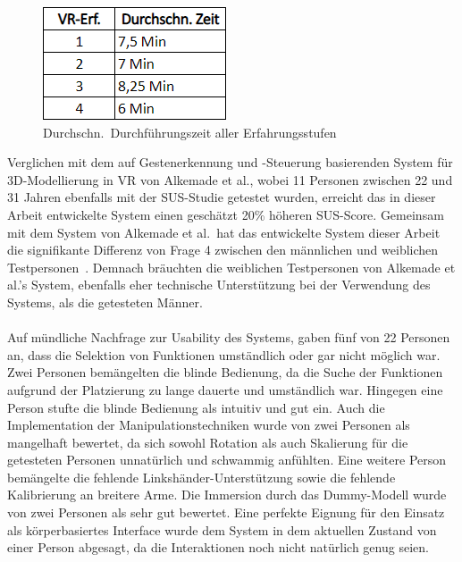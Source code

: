 \begin{figure}[h]
\captionsetup{width=.7\linewidth}
\includegraphics[scale=1.0]{Bilder/Hauptteil/durchschnittzeitvrerf}
\centering
\caption{Durchschn.~Durchführungszeit aller Erfahrungsstufen}
\label{fig:durchschnittzeitalle}
\end{figure}

\noindent Verglichen mit dem auf Gestenerkennung und -Steuerung basierenden System für 3D-Modellierung in VR von Alkemade et al., wobei 11 Personen zwischen 22 und 31 Jahren ebenfalls mit der SUS-Studie getestet wurden, erreicht das in dieser Arbeit entwickelte System einen geschätzt 20\% höheren SUS-Score. Gemeinsam mit dem System von Alkemade et al.~hat das entwickelte System dieser Arbeit die signifikante Differenz von Frage 4 zwischen den männlichen und weiblichen Testpersonen~\citep{alkemade}. Demnach bräuchten die weiblichen Testpersonen von Alkemade et al.'s System, ebenfalls eher technische Unterstützung bei der Verwendung des Systems, als die getesteten Männer.
\\
\\
Auf mündliche Nachfrage zur Usability des Systems, gaben fünf von 22 Personen an, dass die Selektion von Funktionen umständlich oder gar nicht möglich war. Zwei Personen bemängelten die blinde Bedienung, da die Suche der Funktionen aufgrund der Platzierung zu lange dauerte und umständlich war. Hingegen eine Person stufte die blinde Bedienung als intuitiv und gut ein. Auch die Implementation der Manipulationstechniken wurde von zwei Personen als mangelhaft bewertet, da sich sowohl Rotation als auch Skalierung für die getesteten Personen unnatürlich und schwammig anfühlten. Eine weitere Person bemängelte die fehlende Linkshänder-Unterstützung sowie die fehlende Kalibrierung an breitere Arme. Die Immersion durch das Dummy-Modell wurde von zwei Personen als sehr gut bewertet. Eine perfekte Eignung für den Einsatz als körperbasiertes Interface wurde dem System in dem aktuellen Zustand von einer Person abgesagt, da die Interaktionen noch nicht natürlich genug seien.

